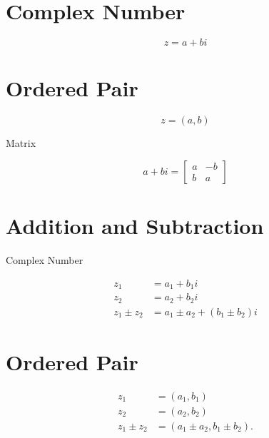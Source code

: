 \documentclass[10pt]{article}
\begin{document}
\section{Complex Number}
$$
z=a+b i
$$

\section{Ordered Pair}
$$
z=(a, b)
$$

Matrix

$$
a+b i=\left[\begin{array}{cc}
a & -b \\
b & a
\end{array}\right]
$$

\section{Addition and Subtraction}
Complex Number

$$
\begin{aligned}
z_{1} & =a_{1}+b_{1} i \\
z_{2} & =a_{2}+b_{2} i \\
z_{1} \pm z_{2} & =a_{1} \pm a_{2}+\left(b_{1} \pm b_{2}\right) i
\end{aligned}
$$

\section{Ordered Pair}
$$
\begin{aligned}
z_{1} & =\left(a_{1}, b_{1}\right) \\
z_{2} & =\left(a_{2}, b_{2}\right) \\
z_{1} \pm z_{2} & =\left(a_{1} \pm a_{2}, b_{1} \pm b_{2}\right) .
\end{aligned}
$$
\end{document}
